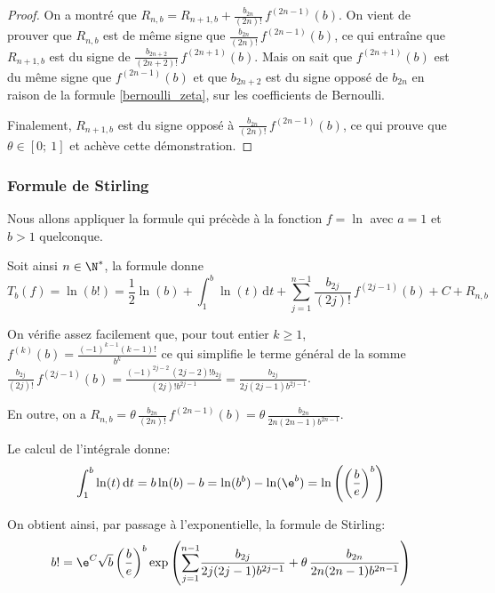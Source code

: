\begin{proof}
On a montré que $R_{n,b} = R_{n+1,b} + \frac{b_{2n}}{(2n)!} \, f^{(2n-1)}(b)$. On vient de prouver que $R_{n,b}$ est de même signe que $\frac{b_{2n}}{(2n)!} \, f^{(2n-1)}(b)$, ce qui entraîne que $R_{n+1,b}$ est du signe de $\frac{b_{2n+2}}{(2n+2)!} \, f^{(2n+1)}(b)$. Mais on sait que $f^{(2n+1)}(b)$ est du même signe que $f^{(2n-1)}(b)$ et que $b_{2n+2}$ est du signe opposé de $b_{2n}$ en raison de la formule \ref{bernoulli_zeta}, sur les coefficients de Bernoulli.

\medskip
Finalement, $R_{n+1,b}$ est du signe opposé à $\frac{b_{2n}}{(2n)!} \, f^{(2n-1)}(b)$, ce qui prouve que $\theta \in [0;~1]$ et achève cette démonstration.
\end{proof}


\subsubsection{Formule de Stirling}

Nous allons appliquer la formule qui précède à la fonction $f = \ln$ avec $a=1$ et $b > 1$ quelconque. 

\medskip
Soit ainsi $n \in \N^*$, la formule donne 
\[
T_b(f) = \ln(b!) = \frac{1}{2} \ln(b) + \displaystyle{\int_1^b} \ln(t) \, \mathrm d t + \displaystyle{\sum_{j=1}^{n-1}} \frac{b_{2j}}{(2j)!} \, f^{(2j-1)}(b) + C + R_{n,b}
\]
 
On vérifie assez facilement que, pour tout entier $k \geq 1$, $f^{(k)}(b) =  \frac{(-1)^{k-1} (k-1)!}{b^{k}}$ ce qui simplifie le terme général de la somme $\frac{b_{2j}}{(2j)!} \, f^{(2j-1)}(b) = \frac{(-1)^{2j-2} \, (2j-2)! b_{2j}}{(2j)! b^{2j-1}} = \frac{b_{2j}}{2j(2j-1)b^{2j-1}}$.

\medskip
En outre, on a $R_{n,b} = \theta \, \frac{b_{2n}}{(2n)!} \, f^{(2n-1)}(b) = \theta \,\frac{b_{2n}}{2n(2n-1)b^{2n-1}}$.

\medskip
Le calcul de l'intégrale donne:
\[
\displaystyle{\int_1^b} \ln(t) \, \mathrm d t = b \ln (b) - b = \ln(b^b) - \ln(\e^b) = \ln \left ( \left (\frac{b}{e}\right )^b\right )
\]

\medskip
On obtient ainsi, par passage à l'exponentielle, la formule de Stirling:
\begin{equation}
\label{stirling_prov}
b! = \e^C \sqrt{b} \left ( \frac{b}{e}\right )^b \exp\left ( \displaystyle{\sum_{j=1}^{n-1}} \frac{b_{2j}}{2j(2j-1)b^{2j-1}} + \theta \, \frac{b_{2n}}{2n(2n-1)b^{2n-1}} \right )
\end{equation}



